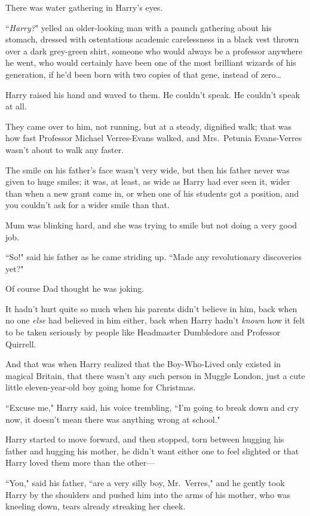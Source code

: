 There was water gathering in Harry's eyes.

``\emph{Harry?}" yelled an older-looking man with a paunch gathering about his stomach, dressed with ostentatious academic carelessness in a black vest thrown over a dark grey-green shirt, someone who would always be a professor anywhere he went, who would certainly have been one of the most brilliant wizards of his generation, if he'd been born with two copies of that gene, instead of zero{\ldots}

Harry raised his hand and waved to them. He couldn't speak. He couldn't speak at all.

They came over to him, not running, but at a steady, dignified walk; that was how fast Professor Michael Verres-Evans walked, and Mrs.~Petunia Evans-Verres wasn't about to walk any faster.

The smile on his father's face wasn't very wide, but then his father never was given to huge smiles; it was, at least, as wide as Harry had ever seen it, wider than when a new grant came in, or when one of his students got a position, and you couldn't ask for a wider smile than that.

Mum was blinking hard, and she was trying to smile but not doing a very good job.

``So!" said his father as he came striding up. ``Made any revolutionary discoveries yet?"

Of course Dad thought he was joking.

It hadn't hurt quite so much when his parents didn't believe in him, back when no one \emph{else} had believed in him either, back when Harry hadn't \emph{known} how it felt to be taken seriously by people like Headmaster Dumbledore and Professor Quirrell.

And that was when Harry realized that the Boy-Who-Lived only existed in magical Britain, that there wasn't any such person in Muggle London, just a cute little eleven-year-old boy going home for Christmas.

``Excuse me," Harry said, his voice trembling, ``I'm going to break down and cry now, it doesn't mean there was anything wrong at school."

Harry started to move forward, and then stopped, torn between hugging his father and hugging his mother, he didn't want either one to feel slighted or that Harry loved them more than the other—

``You," said his father, ``are a very silly boy, Mr.~Verres," and he gently took Harry by the shoulders and pushed him into the arms of his mother, who was kneeling down, tears already streaking her cheek.

